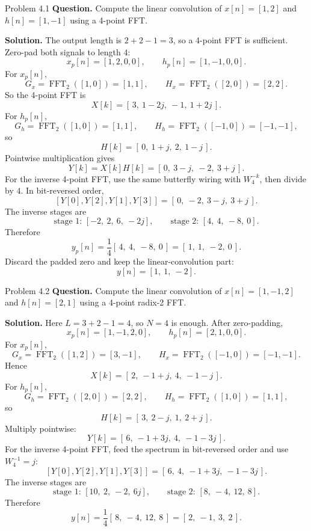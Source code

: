 \documentclass[10pt]{article}
\newcommand{\Prompt}[1]{\textbf{Question.} #1}
\newcommand{\SketchLabel}{\tcblower\textbf{Solution.}}
\begin{document}
\begin{examplebox}{Problem 4.1}
  \Prompt{Compute the linear convolution of \(x[n]=[1,2]\) and \(h[n]=[1,-1]\) using a 4-point FFT.}

  \medskip
  \SketchLabel{}
  The output length is \(2+2-1=3\), so a 4-point FFT is sufficient. Zero-pad both signals to length \(4\):
  \[
    x_p[n]=[1,2,0,0],\qquad h_p[n]=[1,-1,0,0].
  \]
  For \(x_p[n]\),
  \[
    G_x=\operatorname{FFT}_2([1,0])=[1,1],\qquad H_x=\operatorname{FFT}_2([2,0])=[2,2].
  \]
  So the 4-point FFT is
  \[
    X[k]=[\,3,\ 1-2j,\ -1,\ 1+2j\,].
  \]
  For \(h_p[n]\),
  \[
    G_h=\operatorname{FFT}_2([1,0])=[1,1],\qquad H_h=\operatorname{FFT}_2([-1,0])=[-1,-1],
  \]
  so
  \[
    H[k]=[\,0,\ 1+j,\ 2,\ 1-j\,].
  \]
  Pointwise multiplication gives
  \[
    Y[k]=X[k]H[k]=[\,0,\ 3-j,\ -2,\ 3+j\,].
  \]
  For the inverse 4-point FFT, use the same butterfly wiring with \(W_4^{-k}\), then divide by \(4\). In bit-reversed order,
  \[
    [Y[0],Y[2],Y[1],Y[3]]=[\,0,\ -2,\ 3-j,\ 3+j\,].
  \]
  The inverse stages are
  \[
    \text{stage 1: }[-2,\ 2,\ 6,\ -2j],
    \qquad
    \text{stage 2: }[4,\ 4,\ -8,\ 0].
  \]
  Therefore
  \[
    y_p[n]=\frac14[\,4,\ 4,\ -8,\ 0\,]=[\,1,\ 1,\ -2,\ 0\,].
  \]
  Discard the padded zero and keep the linear-convolution part:
  \[
    y[n]=[1,\ 1,\ -2].
  \]
\end{examplebox}

\begin{examplebox}{Problem 4.2}
  \Prompt{Compute the linear convolution of \(x[n]=[1,-1,2]\) and \(h[n]=[2,1]\) using a 4-point radix-2 FFT.}

  \medskip
  \SketchLabel{}
  Here \(L=3+2-1=4\), so \(N=4\) is enough. After zero-padding,
  \[
    x_p[n]=[1,-1,2,0],\qquad h_p[n]=[2,1,0,0].
  \]
  For \(x_p[n]\),
  \[
    G_x=\operatorname{FFT}_2([1,2])=[3,-1],\qquad H_x=\operatorname{FFT}_2([-1,0])=[-1,-1].
  \]
  Hence
  \[
    X[k]=[\,2,\ -1+j,\ 4,\ -1-j\,].
  \]
  For \(h_p[n]\),
  \[
    G_h=\operatorname{FFT}_2([2,0])=[2,2],\qquad H_h=\operatorname{FFT}_2([1,0])=[1,1],
  \]
  so
  \[
    H[k]=[\,3,\ 2-j,\ 1,\ 2+j\,].
  \]
  Multiply pointwise:
  \[
    Y[k]=[\,6,\ -1+3j,\ 4,\ -1-3j\,].
  \]
  For the inverse 4-point FFT, feed the spectrum in bit-reversed order and use \(W_4^{-1}=j\):
  \[
    [Y[0],Y[2],Y[1],Y[3]]=[\,6,\ 4,\ -1+3j,\ -1-3j\,].
  \]
  The inverse stages are
  \[
    \text{stage 1: }[10,\ 2,\ -2,\ 6j],
    \qquad
    \text{stage 2: }[8,\ -4,\ 12,\ 8].
  \]
  Therefore
  \[
    y[n]=\frac14[\,8,\ -4,\ 12,\ 8\,]=[\,2,\ -1,\ 3,\ 2\,].
  \]
\end{examplebox}
\newpage
\end{document}

